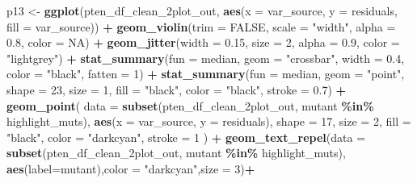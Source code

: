 \documentclass[
]{article}
\newenvironment{Shaded}{\begin{snugshade}}{\end{snugshade}}
\newcommand{\AttributeTok}[1]{\textcolor[rgb]{0.13,0.29,0.53}{#1}}
\newcommand{\ConstantTok}[1]{\textcolor[rgb]{0.56,0.35,0.01}{#1}}
\newcommand{\DecValTok}[1]{\textcolor[rgb]{0.00,0.00,0.81}{#1}}
\newcommand{\FloatTok}[1]{\textcolor[rgb]{0.00,0.00,0.81}{#1}}
\newcommand{\FunctionTok}[1]{\textcolor[rgb]{0.13,0.29,0.53}{\textbf{#1}}}
\newcommand{\NormalTok}[1]{#1}
\newcommand{\OtherTok}[1]{\textcolor[rgb]{0.56,0.35,0.01}{#1}}
\newcommand{\SpecialCharTok}[1]{\textcolor[rgb]{0.81,0.36,0.00}{\textbf{#1}}}
\newcommand{\StringTok}[1]{\textcolor[rgb]{0.31,0.60,0.02}{#1}}
\begin{document}
\begin{Shaded}
\begin{Highlighting}[]
\NormalTok{p13 }\OtherTok{\textless{}{-}} \FunctionTok{ggplot}\NormalTok{(pten\_df\_clean\_2plot\_out, }\FunctionTok{aes}\NormalTok{(}\AttributeTok{x =}\NormalTok{ var\_source, }\AttributeTok{y =}\NormalTok{ residuals, }\AttributeTok{fill =}\NormalTok{ var\_source)) }\SpecialCharTok{+}
  \FunctionTok{geom\_violin}\NormalTok{(}\AttributeTok{trim =} \ConstantTok{FALSE}\NormalTok{, }\AttributeTok{scale =} \StringTok{"width"}\NormalTok{, }\AttributeTok{alpha =} \FloatTok{0.8}\NormalTok{, }\AttributeTok{color =} \ConstantTok{NA}\NormalTok{) }\SpecialCharTok{+}
  \FunctionTok{geom\_jitter}\NormalTok{(}\AttributeTok{width =} \FloatTok{0.15}\NormalTok{, }\AttributeTok{size =} \DecValTok{2}\NormalTok{, }\AttributeTok{alpha =} \FloatTok{0.9}\NormalTok{, }\AttributeTok{color =} \StringTok{"lightgrey"}\NormalTok{) }\SpecialCharTok{+}
  \FunctionTok{stat\_summary}\NormalTok{(}\AttributeTok{fun =}\NormalTok{ median, }\AttributeTok{geom =} \StringTok{"crossbar"}\NormalTok{, }\AttributeTok{width =} \FloatTok{0.4}\NormalTok{, }\AttributeTok{color =} \StringTok{"black"}\NormalTok{, }\AttributeTok{fatten =} \DecValTok{1}\NormalTok{) }\SpecialCharTok{+}
  \FunctionTok{stat\_summary}\NormalTok{(}\AttributeTok{fun =}\NormalTok{ median, }\AttributeTok{geom =} \StringTok{"point"}\NormalTok{, }\AttributeTok{shape =} \DecValTok{23}\NormalTok{, }\AttributeTok{size =} \DecValTok{1}\NormalTok{, }\AttributeTok{fill =} \StringTok{"black"}\NormalTok{, }\AttributeTok{color =} \StringTok{"black"}\NormalTok{, }\AttributeTok{stroke =} \FloatTok{0.7}\NormalTok{) }\SpecialCharTok{+}
    \FunctionTok{geom\_point}\NormalTok{(}
    \AttributeTok{data =} \FunctionTok{subset}\NormalTok{(pten\_df\_clean\_2plot\_out, mutant }\SpecialCharTok{\%in\%}\NormalTok{ highlight\_muts),}
    \FunctionTok{aes}\NormalTok{(}\AttributeTok{x =}\NormalTok{ var\_source, }\AttributeTok{y =}\NormalTok{ residuals),}
    \AttributeTok{shape =} \DecValTok{17}\NormalTok{,}
    \AttributeTok{size =} \DecValTok{2}\NormalTok{,}
    \AttributeTok{fill =} \StringTok{"black"}\NormalTok{,}
    \AttributeTok{color =} \StringTok{"darkcyan"}\NormalTok{,}
    \AttributeTok{stroke =} \DecValTok{1}
\NormalTok{  ) }\SpecialCharTok{+} 
  \FunctionTok{geom\_text\_repel}\NormalTok{(}\AttributeTok{data =} \FunctionTok{subset}\NormalTok{(pten\_df\_clean\_2plot\_out, mutant }\SpecialCharTok{\%in\%}\NormalTok{ highlight\_muts),}
    \FunctionTok{aes}\NormalTok{(}\AttributeTok{label=}\NormalTok{mutant),}\AttributeTok{color =} \StringTok{"darkcyan"}\NormalTok{,}\AttributeTok{size =} \DecValTok{3}\NormalTok{)}\SpecialCharTok{+}

\end{Highlighting}
\end{Shaded}
\end{document}
